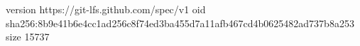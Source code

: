 version https://git-lfs.github.com/spec/v1
oid sha256:8b9e41b6e4cc1ad256c8f74ed3ba455d7a11afb467cd4b0625482ad737b8a253
size 15737
